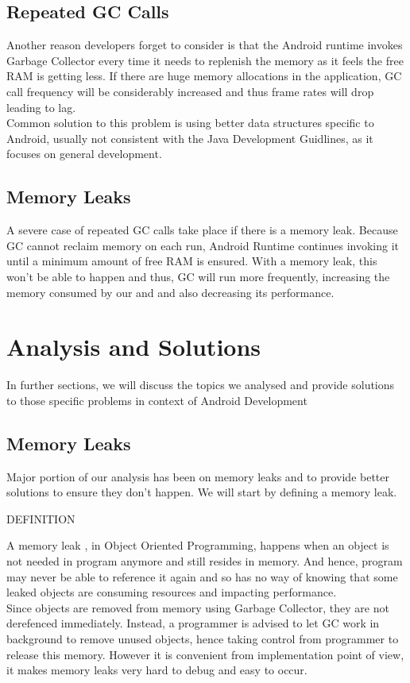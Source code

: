 \documentclass[journal]{IEEEtran}
\begin{document}
\subsection{Repeated GC Calls}
Another reason developers forget to consider is that the Android runtime invokes Garbage Collector every time it needs to replenish the memory as it feels the free RAM is getting less. If there are huge memory allocations in the application, GC call frequency will be considerably increased and thus frame rates will drop leading to lag.\\
Common solution to this problem is using better data structures specific to Android, usually not consistent with the Java Development Guidlines, as it focuses on general development.

\subsection{Memory Leaks}
A severe case of repeated GC calls take place if there is a memory leak. Because GC cannot reclaim memory on each run, Android Runtime continues invoking it until a minimum amount of free RAM is ensured. With a memory leak, this won't be able to happen and thus, GC will run more frequently, increasing the memory consumed by our and and also decreasing its performance.

\section{Analysis and Solutions}
In further sections, we will discuss the topics we analysed and provide solutions to those specific problems in context of Android Development

\subsection{Memory Leaks}
Major portion of our analysis has been on memory leaks and to provide better solutions to ensure they don't happen. We will start by defining a memory leak.\\

\begin{center}
	DEFINITION
\end{center}
A memory leak \cite{memleak}, in Object Oriented Programming, happens when an object is not needed in program anymore and still resides in memory. And hence, program may never be able to reference it again and so has no way of knowing that some leaked objects are consuming resources and impacting performance.\\
Since objects are removed from memory using Garbage Collector, they are not derefenced immediately. Instead, a programmer is advised to let GC work in background to remove unused objects, hence taking control from programmer to release this memory. However it is convenient from implementation point of view, it makes memory leaks very hard to debug and easy to occur.\\
\end{document}
